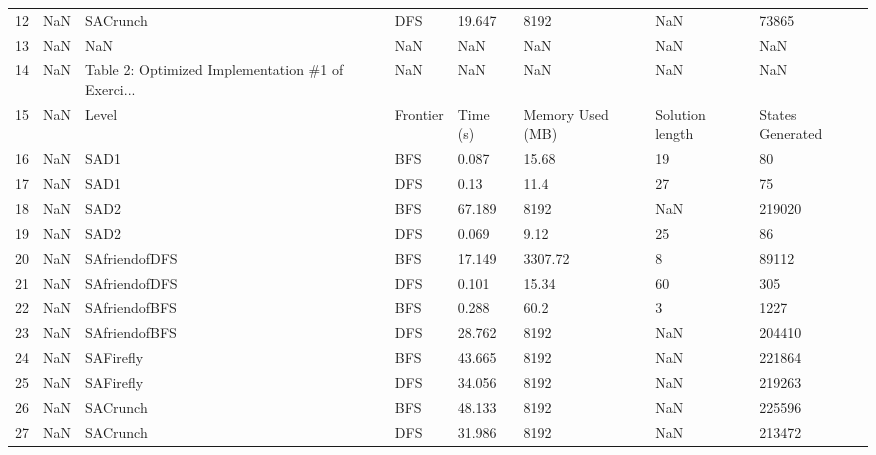 \begin{tabular}{lrllllll}
12 &         NaN &                                           SACrunch &        DFS &     19.647 &              8192 &              NaN &             73865 \\
13 &         NaN &                                                NaN &        NaN &        NaN &               NaN &              NaN &               NaN \\
14 &         NaN &  Table 2: Optimized Implementation \#1 of Exerci... &        NaN &        NaN &               NaN &              NaN &               NaN \\
15 &         NaN &                                              Level &   Frontier &   Time (s) &  Memory Used (MB) &  Solution length &  States Generated \\
16 &         NaN &                                               SAD1 &        BFS &      0.087 &             15.68 &               19 &                80 \\
17 &         NaN &                                               SAD1 &        DFS &       0.13 &              11.4 &               27 &                75 \\
18 &         NaN &                                               SAD2 &        BFS &     67.189 &              8192 &              NaN &            219020 \\
19 &         NaN &                                               SAD2 &        DFS &      0.069 &              9.12 &               25 &                86 \\
20 &         NaN &                                      SAfriendofDFS &        BFS &     17.149 &           3307.72 &                8 &             89112 \\
21 &         NaN &                                      SAfriendofDFS &        DFS &      0.101 &             15.34 &               60 &               305 \\
22 &         NaN &                                      SAfriendofBFS &        BFS &      0.288 &              60.2 &                3 &              1227 \\
23 &         NaN &                                      SAfriendofBFS &        DFS &     28.762 &              8192 &              NaN &            204410 \\
24 &         NaN &                                          SAFirefly &        BFS &     43.665 &              8192 &              NaN &            221864 \\
25 &         NaN &                                          SAFirefly &        DFS &     34.056 &              8192 &              NaN &            219263 \\
26 &         NaN &                                           SACrunch &        BFS &     48.133 &              8192 &              NaN &            225596 \\
27 &         NaN &                                           SACrunch &        DFS &     31.986 &              8192 &              NaN &            213472 \\
\bottomrule
\end{tabular}
